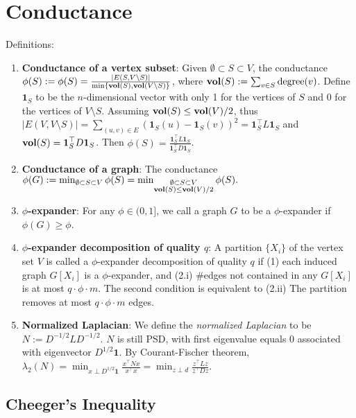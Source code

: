 \section{Conductance}

Definitions:
\begin{enumerate}
    \item \textbf{Conductance of a vertex subset}: Given $\emptyset \subset S \subset V$, the conductance $\phi(S) := \phi(S)=\frac{|E(S, V \backslash S)|}{\min \{\operatorname{\textbf{vol}}(S), \operatorname{\textbf{vol}}(V \backslash S)\}}$, where $\operatorname{\textbf{vol}}(S) := \sum_{v \in S} \text{degree}(v)$. Define $\boldsymbol{1}_S$ to be the $n$-dimensional vector with only 1 for the vertices of $S$ and 0 for the vertices of $V \setminus S$. Assuming $\operatorname{\textbf{vol}}(S) \le \operatorname{\textbf{vol}}(V)/2$, thus $|E(V, V\setminus S)|= \sum_{(u,v)\in E} (\boldsymbol{1}_S(u) - \boldsymbol{1}_S(v))^2 = \boldsymbol{1}_S^\top L \boldsymbol{1}_S$ and $\operatorname{\textbf{vol}}(S) = \boldsymbol{1}_S^\top D \boldsymbol{1}_S$. Then $\phi(S) = \frac{\boldsymbol{1}_S^\top L \boldsymbol{1}_S}{\boldsymbol{1}_S^\top D \boldsymbol{1}_S}$.

    \item \textbf{Conductance of a graph}: The conductance $\phi(G) := \min_{\emptyset \subset S \subset V} \phi(S) = \min_{\substack{\emptyset \subset S \subset V \\ \operatorname{\textbf{vol}}(S)\le\operatorname{\textbf{vol}}(V)/2}} \phi(S).$

    \item \textbf{$\phi$-expander}: For any $\phi \in (0,1]$, we call a graph $G$ to be a $\phi$-expander if $\phi(G)\ge \phi$.
    \item \textbf{$\phi$-expander decomposition of quality $q$}: A partition $\{X_i\}$ of the vertex set $V$ is called a $\phi$-expander decomposition of quality $q$ if (1) each induced graph $G[X_i]$ is a $\phi$-expander, and (2.i) \#edges not contained in any $G[X_i]$ is at most $q\cdot\phi\cdot m$. The second condition is equivalent to (2.ii) The partition removes at most $q\cdot\phi\cdot m$ edges.
    \item \textbf{Normalized Laplacian}: We define the \textit{normalized Laplacian} to be $N := D^{-1/2} L D^{-1/2}$. $N$ is still PSD, with first eigenvalue equals 0 associated with eigenvector $D^{1/2}\boldsymbol{1}$. By Courant-Fischer theorem, $\lambda_2(N) = \min_{x \perp D^{1/2}\boldsymbol{1}} \frac{x^\top N x}{x^\top x} = \min_{z \perp d} \frac{z^\top L z}{z^\top D z}$.
\end{enumerate}

\subsection{Cheeger's Inequality}

